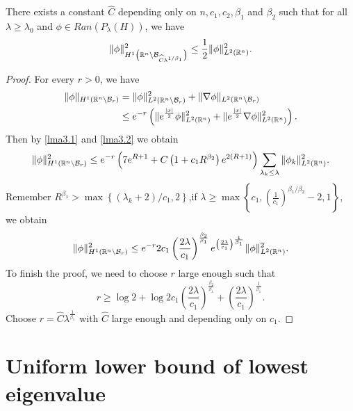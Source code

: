 \begin{proposition}
	There exists a constant $\widehat{C}$ depending only on $n,c_1,c_2,\beta _1$ and $\beta _2$ such that for all $\lambda\ge \lambda_0$ and $\phi \in Ran\left( P_\lambda(H) \right) $, we have
	\begin{equation}
		\|\phi\|^2_{H^{1}\left( \mathbb{R}^{n}\backslash  \mathcal{B}_{\widehat{C}\lambda^{1 /\beta _1}} \right) }\le \frac{1}{2}\|\phi\|^2_{L^2(\mathbb{R}^{n})}.
	\end{equation}
\end{proposition}	 
\begin{proof}
	For every $r>0$, we have
	\begin{equation*}
		\begin{aligned}
			\|\phi\|_{H^{1}\left( \mathbb{R}^{n}\backslash \mathcal{B}_{r} \right) }&= \|\phi\|_{L^2\left( \mathbb{R}^{n}\backslash  \mathcal{B}_{r} \right) }^2+ \|\nabla \phi\|_{L^2\left( \mathbb{R}^{n}\backslash  \mathcal{B}_{r} \right) }\\					&\le e^{-r}\left( \|e^{\frac{|x|}{2}}\phi\|^2_{L^2(\mathbb{R}^{n})}+ \|e^{\frac{|x|}{2}}\nabla \phi\|_{L^2(\mathbb{R}^{n})}^2 \right) 
		.\end{aligned}
	\end{equation*}
	Then by \cref{lma3.1} and \cref{lma3.2} we obtain
	\[
	\|\phi\|^2_{H^{1}(\mathbb{R}^{n}\backslash \mathcal{B}_r)}\le e^{-r} \left( 7e^{R+1}+C\left( 1+c_1 R^{\beta _2} \right) e^{2(R+1)} \right)  \sum_{\lambda_k\le \lambda} \|\phi_k\|_{L^2\left( \mathbb{R}^{n} \right) }^2. 
	\] 
	Remember $R^{\beta _1}> \max \left\{\left( \lambda_k+2 \right) /c_1,2\right\} $,if $\displaystyle \lambda \ge \max\left\{ c_1, \left(\frac{1}{c_1}\right)^{\beta _1 /\beta _2}-2,1\right\}$, we obtain
	\[
	\|\phi\|^2_{H^{1}(\mathbb{R}^{n}\backslash \mathcal{B}_r)}\le e^{-r}  2c_1 \left( \frac{2\lambda}{c_1} \right) ^{\frac{\beta _2}{\beta _1}}e^{\left( \frac{2\lambda}{c_1} \right) ^{\frac{1}{\beta _1}}}\|\phi\|^2_{L^2(\mathbb{R}^{n})}.
	\] 
To finish the proof, we need to choose $r$ large enough such that
\[
r\ge\log 2+\log 2 c_1 \left( \frac{2\lambda}{c_1} \right)^{\frac{\beta _2}{\beta _1}}+ \left( \frac{2\lambda}{c_1} \right) ^{\frac{1}{\beta _1}}. 
\]
Choose $\displaystyle r=\widehat{C}\lambda ^{\frac{1}{\beta _1}} $ with $\widehat{C}$ large enough and depending only on $c_1$.
\end{proof}
\fi



\section{Uniform lower bound of lowest eigenvalue}

